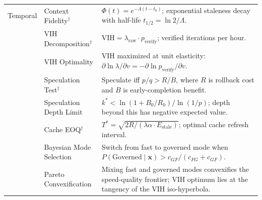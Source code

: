 \documentclass[11pt, a4paper]{googledeepmind}
\begin{document}
\begin{appendices}
\begin{longtable}{p{1.6cm}p{3.2cm}p{7.8cm}}
Temporal
    & Context Fidelity$^\dagger$ & $\Phi(t) = e^{-\Lambda(t-t_0)}$; exponential staleness decay with half-life $t_{1/2} = \ln 2 / \Lambda$. \\
    & VIH Decomposition$^\dagger$ & $\text{VIH} = \lambda_{\text{raw}} \cdot p_{\text{verify}}$; verified iterations per hour. \\
    & VIH Optimality & VIH maximized at unit elasticity: $\partial \ln \lambda / \partial v = -\partial \ln p_{\text{verify}} / \partial v$. \\
    & Speculation Test$^\dagger$ & Speculate iff $p/q > R/B$, where $R$ is rollback cost and $B$ is early-completion benefit. \\
    & Speculation Depth Limit & $k^* < \ln(1 + B_0/R_0)/\ln(1/p)$; depth beyond this has negative expected value. \\
    & Cache EOQ$^\dagger$ & $T^* = \sqrt{2R/(\lambda\alpha \cdot E_{\text{stale}})}$; optimal cache refresh interval. \\
    & Bayesian Mode Selection & Switch from fast to governed mode when $P(\text{Governed} \mid \mathbf{x}) > c_{GF}/(c_{FG} + c_{GF})$. \\
    & Pareto Convexification & Mixing fast and governed modes convexifies the speed-quality frontier; VIH optimum lies at the tangency of the VIH iso-hyperbola. \\

\midrule


\end{longtable}
\end{appendices}
\end{document}
